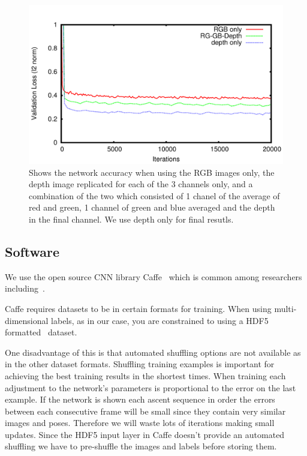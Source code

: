 \documentclass[11pt]{article} %
\begin{document}
\begin{figure}
\centering
\includegraphics*[width=0.8\linewidth,clip]{rgbComp.pdf} %
\caption{Shows the network accuracy when using the RGB images only, the depth image replicated for each of the 3 channels only, and a combination of the two which consisted of 1 chanel of the average of red and green, 1 channel of green and blue averaged and the depth in the final channel. We use depth only for final resutls. }
\label{fig:rgbdcomp}
\end{figure}





\subsection{Software}

We use the open source CNN library Caffe~\cite{Jia2014} which is common among researchers including~\cite{Chen, Pfister,Girshick2014,Springenberg2015,Schwarz2015,Simonyan2015,Wang2015}. 

Caffe requires datasets to be in certain formats for training. When using multi-dimensional labels, as in our case, you are constrained to using a HDF5 formatted~\cite{Folk2011} dataset. 

One disadvantage of this is that automated shuffling options are not available as in the other dataset formats. Shuffling training examples is important for achieving the best training results in the shortest times. When training each adjustment to the network's parameters is proportional to the error on the last example. If the network is shown each ascent sequence in order the errors between each consecutive frame will be small since they contain very similar images and poses. Therefore we will waste lots of iterations making small updates. Since the HDF5 input layer in Caffe doesn't provide an automated shuffling we have to pre-shuffle the images and labels before storing them.
\end{document}
